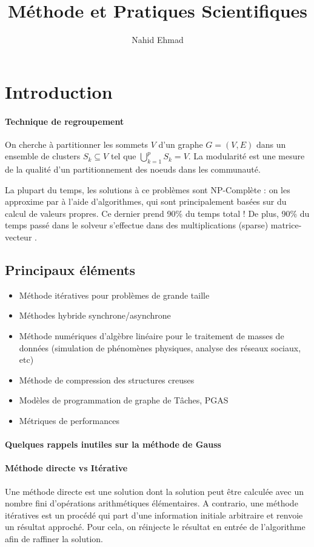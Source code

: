 \documentclass{article}
\title{Méthode et Pratiques Scientifiques}
\author{Nahid Ehmad}
\date{}
\begin{document}
\maketitle
\tableofcontents
\newpage


\section{Introduction}
\paragraph{Technique de regroupement}
On cherche à partitionner les sommets $V$ d'un graphe $G=(V,E)$ dans un ensemble de clusters $S_k\subseteq V$ tel que $\bigcup_{k=1}^{p}S_k = V$. La modularité est une mesure de la qualité d'un partitionnement des noeuds dans les communauté. 
\bigskip

La plupart du temps, les solutions à ce problèmes sont NP-Complète : on les approxime par à l'aide d'algorithmes, qui sont principalement basées sur du calcul de valeurs propres. Ce dernier prend 90\% du temps total ! De plus, 90\% du temps passé dans le solveur s'effectue dans des multiplications (sparse) matrice-vecteur .

\subsection{Principaux éléments}
\begin{itemize}
\item Méthode itératives pour problèmes de grande taille
\item Méthodes hybride synchrone/asynchrone
\item Méthode numériques d'algèbre linéaire pour le traitement de masses de données (simulation de phénomènes physiques, analyse des réseaux sociaux, etc)
\item Méthode de compression des structures creuses
\item Modèles de programmation de graphe de Tâches, PGAS
\item Métriques de performances
\end{itemize}

\paragraph{Quelques rappels inutiles sur la méthode de Gauss}

\paragraph{Méthode directe vs Itérative} Une méthode directe est une solution dont la solution peut être calculée avec un nombre fini d'opérations arithmétiques élémentaires. A contrario, une méthode itératives est un procédé qui part d'une information initiale arbitraire et renvoie un résultat approché. Pour cela, on réinjecte le résultat en entrée de l'algorithme afin de raffiner la solution.
\end{document}
